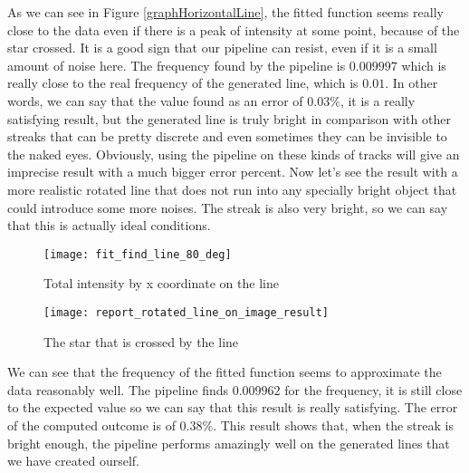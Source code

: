 \documentclass[a4paper,12pt,oneside]{report}
\begin{document}
As we can see in Figure \ref{graphHorizontalLine}, the fitted function seems really close to the data even if there is a peak of intensity
at some point, because of the star crossed. It is a good sign that our pipeline can resist, even if it is a small amount of noise here. 
\newline
The frequency found by the pipeline is $0.009997$ which is really close to the real frequency of the generated line, which is $0.01$. 
In other words, we can say that the value found as an error of $0.03\%$, it is a really satisfying result, but the generated line
is truly bright in comparison with other streaks that can be pretty discrete and even sometimes they can be invisible to the naked eyes.
Obviously, using the pipeline on these kinds of tracks will give an imprecise result with a much bigger error percent.
\newline
\newline
Now let's see the result with a more realistic rotated line that does not run  into any specially bright object that could introduce some 
more noises. The streak is also very bright, so we can say that this is actually ideal conditions.
\begin{figure}[h]
    \begin{minipage}[c]{.47\linewidth}
        \centering
        \texttt{[image: fit\_find\_line\_80\_deg]}
        \caption{Total intensity by x coordinate on the line}
        \label{graphRotatedLine}
    \end{minipage}
    \hfill
    \begin{minipage}[c]{.47\linewidth}
        \centering
        \texttt{[image: report\_rotated\_line\_on\_image\_result]}
        \caption{The star that is crossed by the line}
    \end{minipage}
\end{figure}
\newline
We can see that the frequency of the fitted function seems to approximate the data reasonably well. The pipeline finds $0.009962$ for the
frequency, it is still close to the expected value so we can say that this result is really satisfying. The error of the computed outcome
is of $0.38\%$. This result shows that, when the streak is bright enough, the pipeline performs amazingly well on the generated lines that
we have created ourself.

\end{document}
